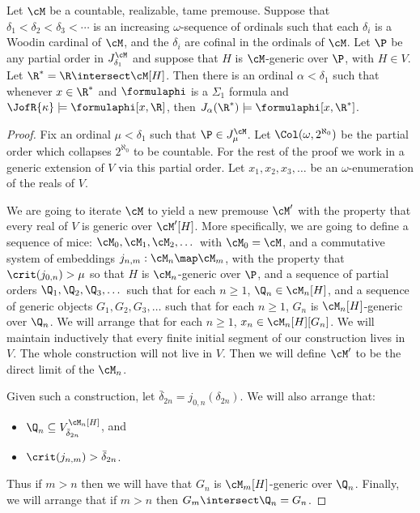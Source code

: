\begin{lemma}
Let $\cM$ be a countable, realizable, tame premouse. Suppose that
$\delta_1<\delta_2<\delta_3<\cdots$ is an increasing $\omega$-sequence of
ordinals such that each $\delta_i$ is a Woodin cardinal of $\cM$,
and the $\delta_i$ are cofinal in the ordinals of $\cM$.
Let $\P$ be any partial order in $J^{\cM}_{\delta_1}$ and suppose that
 $H$ is $\cM$-generic over $\P$, with $H\in V$.
Let $\R^*=\R\intersect\cM[H]$.
Then there is an ordinal $\alpha<\delta_1$
such that whenever $x\in\R^*$ and $\formulaphi$ is a $\Sigma_1$ formula
and $\JofR{\kappa}\models\formulaphi[x,\R]$, then
 $J_{\alpha}(\R^*)\models\formulaphi[x,\R^*]$.
\end{lemma}
\begin{proof}
 Fix an ordinal $\mu<\delta_1$
such that $\P\in J^{\cM}_{\mu}$.
Let $\Col(\omega,2^{\aleph_0})$ be the partial order which collapses
$2^{\aleph_0}$ to be countable. For the rest of the proof we work
in a generic extension of $V$ via this partial order.
 Let $x_1,x_2,x_3,\dots$ be an
$\omega$-enumeration  of the reals of $V$.

We are going to iterate $\cM$ to yield a new premouse $\cM^{\prime}$
with the property that every real of $V$ is generic over $\cM^{\prime}[H]$.
More specifically, we are going to define
a sequence of mice: $\cM_0, \cM_1, \cM_2, \dots$ with $\cM_0=\cM$,
and a commutative system of embeddings $j_{n,m}:\cM_n\map\cM_m$,
with the property that $\crit(j_{0,n})>\mu$ so that $H$ is $\cM_n$-generic
over $\P$, and
a sequence of partial orders $\Q_1,\Q_2,\Q_3,\dots$ such that
for each  $n\geq1$, $\Q_n\in\cM_n[H]$, and a sequence of generic objects
$G_1,G_2,G_3,\dots$ such that for each $n\geq1$, $G_n$ is
$\cM_n[H]$-generic over $\Q_n$.  We will arrange that for each $n\geq 1$,
$x_n\in\cM_n[H][G_n]$.  We will maintain
inductively that every finite initial segment of  our construction lives in
$V$. The whole construction will not live in $V$.  Then we will define
$\cM^{\prime}$ to be the direct limit of the $\cM_n$.

Given such a construction, let $\bar{\delta}_{2n}=j_{0,n}(\delta_{2n})$.
We will also arrange that:
\begin{itemize}
\item $\Q_n\subseteq V_{\bar{\delta}_{2n}}^{\cM_n[H]}$, and
\item $\crit(j_{n,m})>\bar{\delta}_{2n}$.
\end{itemize}
Thus if $m>n$ then we will have that $G_n$ is $\cM_m[H]$-generic
over $\Q_n$. Finally, we will arrange that if $m>n$ then
$G_m\intersect \Q_n = G_n$.


\end{proof}
